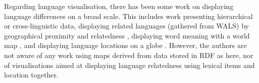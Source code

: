

Regarding language visualisation, there has been some work on displaying language differences on a broad scale. This includes work presenting hierarchical or cross-linguistic data\cite{Rohrdantz:2012, RMB+10}, displaying related languages (gathered from WALS) by geographical proximity and relatedness \cite{LittEACL}, displaying word meaning with a world map \cite{theron}, and displaying language locations on a globe \cite{Haspelmath_etal2008}. However, the authors are not aware of any work using maps derived from data stored in RDF as here, nor of visualisations aimed at displaying language relatedness using lexical items and location together. %